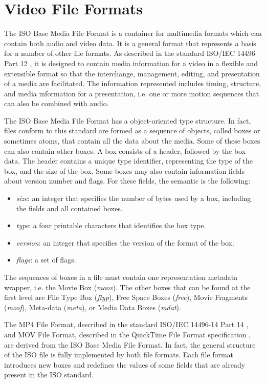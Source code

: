 \chapter{Video File Formats}


The ISO Base Media File Format is a container for multimedia formats which can contain both audio and video data. It is a general format that represents a basis for a number of other file formats.
As described in the standard ISO/IEC 14496 Part 12 \cite{iso}, it is designed to contain media information for a video in a flexible and extensible format so that the interchange, management, editing, and presentation of a media are facilitated. The information represented includes timing, structure, and media information for a presentation, i.e. one or more motion sequences that can also be combined with audio.

The ISO Base Media File Format has a object-oriented type structure. In fact, files conform to this standard are formed as a sequence of objects, called boxes or sometimes atoms, that contain all the data about the media. Some of these boxes can also contain other boxes. A box consists of a header, followed by the box data. The header contains a unique type identifier, representing the type of the box, and the size of the box. Some boxes may also contain information fields about version number and flags. For these fields, the semantic is the following:

\begin{itemize}
\item \emph{size}: an integer that specifies the number of bytes used by a box, including the fields and all contained boxes.
\item \emph{type}: a four printable characters that identifies the box type.
\item \emph{version}: an integer that specifies the version of the format of the box.
\item \emph{flags}: a set of flags.
\end{itemize}

The sequences of boxes in a file must contain one representation metadata wrapper, i.e. the Movie Box (\emph{moov}). The other boxes that can be found at the first level are File Type Box (\emph{ftyp}), Free Space Boxes (\emph{free}), Movie Fragments (\emph{moof}), Meta-data (\emph{meta}), or Media Data Boxes (\emph{mdat}).

The MP4 File Format, described in the standard ISO/IEC 14496-14 Part 14 \cite{mp4}, and MOV File Format, described in the QuickTime File Format specification \cite{mov}, are derived from the ISO Base Media File Format. In fact, the general structure of the ISO file is fully implemented by both file formats. Each file format introduces new boxes and redefines the values of some fields that are already present in the ISO standard.

